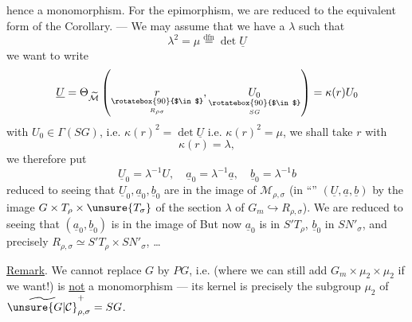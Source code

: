 

hence a monomorphism. For the epimorphism, we are reduced to the equivalent form of the Corollary. --- We may assume that we have a $\lambda$ such that
\[
\lambda^2=\mu\overset{\mathrm{dfn}}{=}\det\underline U
\]
we want to write
\[
\underline U=\Theta_{\widetilde{\mathcal M}}
\left(\underset{\underset{R_{\rho\sigma}}{\rotatebox{90}{$\in$}}}{r},
\underset{\underset{SG}{\rotatebox{90}{$\in$}}}{U_0}\right)
=\kappa(r)U_0
\]
with $U_0\in\Gamma(SG)$, i.e. $\kappa(r)^2=\det\underline U$ i.e. $\kappa(r)^2=\mu$,
we shall take $r$ with \deleted{$\unsure{\kappa}$}
\[
\kappa(r)=\lambda,
\]
 we therefore put
\[
\underline U_0=\lambda^{-1}U,\quad
\underline a_0=\lambda^{-1}\underline a,\quad
\underline b_0=\lambda^{-1}b
\]
  reduced to seeing that $\underline U_0,\underline a_0,\underline b_0$ are in the image of $\mathcal M_{\rho,\sigma}$ (in  ``'' $(\underline U,\underline a,\underline b)$ by the image  $G\times T_\rho\times\unsure{T_\sigma}$ of the section $\lambda$ of $G_m\hookrightarrow R_{\rho,\sigma}$). We are reduced to seeing that $(\underline a_0,\underline b_0)$ is in the image of
But now $\underline a_0$ is in $S'T_\rho$, $\underline b_0$ in $SN'_\sigma$, and precisely $R_{\rho,\sigma}\simeq S'T_\rho\times SN'_\sigma$, \ldots

\uline{Remark}. We cannot replace $G$ by $PG$,
i.e.
(where we can still add $G_m\times\mu_2\times\mu_2$ if we want!) is \uline{not} a monomorphism --- its kernel is precisely the subgroup $\mu_2$ of $\widetilde{\unsure{G|\mathcal C}}_{\rho,\sigma}^{+}=SG$.

